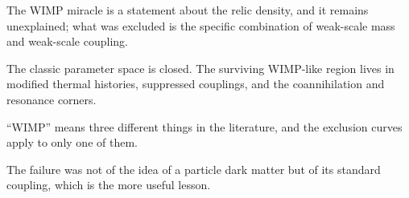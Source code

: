 \begin{keytakeaways}
\item The WIMP miracle is a statement about the relic density, and it
remains unexplained; what was excluded is the specific combination of
weak-scale mass and weak-scale coupling.
\item The classic parameter space is closed. The surviving WIMP-like region
lives in modified thermal histories, suppressed couplings, and the
coannihilation and resonance corners.
\item ``WIMP'' means three different things in the literature, and the
exclusion curves apply to only one of them.
\item The failure was not of the idea of a particle dark matter but of its
standard coupling, which is the more useful lesson.
\end{keytakeaways}
